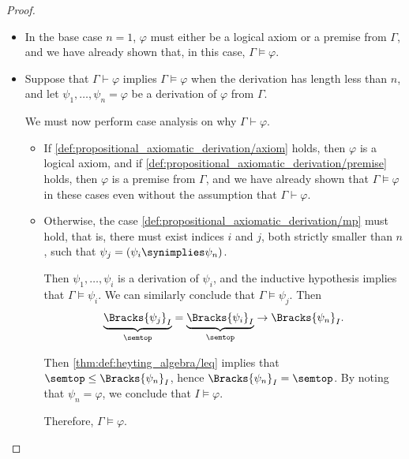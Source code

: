 \begin{proof}
  \begin{itemize}
    \item In the base case \( n = 1 \), \( \varphi \) must either be a logical axiom or a premise from \( \Gamma \), and we have already shown that, in this case, \( \Gamma \vDash \varphi \).

    \item Suppose that \( \Gamma \vdash \varphi \) implies \( \Gamma \vDash \varphi \) when the derivation has length less than \( n \), and let \( \psi_1, \ldots, \psi_n = \varphi \) be a derivation of \( \varphi \) from \( \Gamma \).

    We must now perform case analysis on why \( \Gamma \vdash \varphi \).
    \begin{itemize}
      \item If \cref{def:propositional_axiomatic_derivation/axiom} holds, then \( \varphi \) is a logical axiom, and if \cref{def:propositional_axiomatic_derivation/premise} holds, then \( \varphi \) is a premise from \( \Gamma \), and we have already shown that \( \Gamma \vDash \varphi \) in these cases even without the assumption that \( \Gamma \vdash \varphi \).

      \item Otherwise, the case \cref{def:propositional_axiomatic_derivation/mp} must hold, that is, there must exist indices \( i \) and \( j \), both strictly smaller than \( n \), such that \( \psi_j = (\psi_i \synimplies \psi_n) \).

      Then \( \psi_1, \ldots, \psi_i \) is a derivation of \( \psi_i \), and the inductive hypothesis implies that \( \Gamma \vDash \psi_i \). We can similarly conclude that \( \Gamma \vDash \psi_j \). Then
      \begin{equation*}
        \underbrace{ \Bracks{ \psi_j }_I }_\semtop = \underbrace{ \Bracks{ \psi_i }_I }_\semtop \rightarrow \Bracks{ \psi_n }_I.
      \end{equation*}

      Then \cref{thm:def:heyting_algebra/leq} implies that \( \semtop \leq \Bracks{ \psi_n }_I \), hence \( \Bracks{ \psi_n }_I = \semtop \). By noting that \( \psi_n = \varphi \), we conclude that \( I \vDash \varphi \).

      Therefore, \( \Gamma \vDash \varphi \).
    \end{itemize}
  \end{itemize}
\end{proof}
